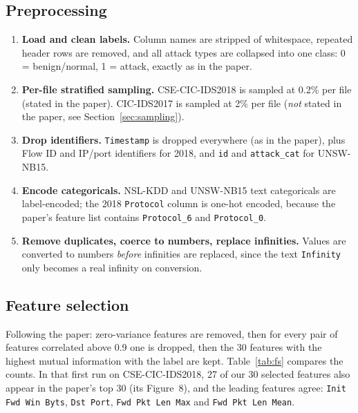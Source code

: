 \documentclass[11pt,a4paper]{article}
\begin{document}
\subsection{Preprocessing}
\begin{enumerate}
  \item \textbf{Load and clean labels.} Column names are stripped of whitespace, repeated header rows are removed,
        and all attack types are collapsed into one class: 0 = benign/normal, 1 = attack, exactly as in the paper.
  \item \textbf{Per-file stratified sampling.} CSE-CIC-IDS2018 is sampled at 0.2\% per file (stated in the paper).
        CIC-IDS2017 is sampled at 2\% per file (\emph{not} stated in the paper, see Section~\ref{sec:sampling}).
  \item \textbf{Drop identifiers.} \texttt{Timestamp} is dropped everywhere (as in the paper), plus Flow ID and
        IP/port identifiers for 2018, and \texttt{id} and \texttt{attack\_cat} for UNSW-NB15.
  \item \textbf{Encode categoricals.} NSL-KDD and UNSW-NB15 text categoricals are label-encoded; the 2018
        \texttt{Protocol} column is one-hot encoded, because the paper's feature list contains
        \texttt{Protocol\_6} and \texttt{Protocol\_0}.
  \item \textbf{Remove duplicates, coerce to numbers, replace infinities.} Values are converted to numbers
        \emph{before} infinities are replaced, since the text \texttt{Infinity} only becomes a real infinity on
        conversion.
\end{enumerate}

\subsection{Feature selection}
Following the paper: zero-variance features are removed, then for every pair of features correlated above 0.9
one is dropped, then the 30 features with the highest mutual information with the label are kept.
Table~\ref{tab:fs} compares the counts. In that first run on CSE-CIC-IDS2018, 27 of our 30 selected features also appear in the
paper's top 30 (its Figure~8), and the leading features agree: \texttt{Init Fwd Win Byts}, \texttt{Dst Port},
\texttt{Fwd Pkt Len Max} and \texttt{Fwd Pkt Len Mean}.
\end{document}
